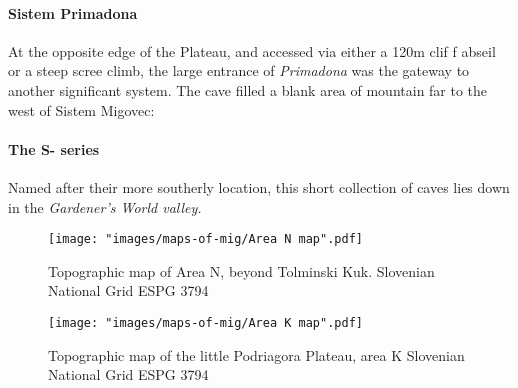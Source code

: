 \paragraph{Sistem Primadona} At the opposite edge of the Plateau, and accessed via either a 120m clif f abseil or a steep scree climb, the large entrance of \emph{Primadona} was the gateway to another significant system. The cave filled a blank area of mountain far to the west of Sistem Migovec: 

\paragraph{The S- series} Named after their more southerly location, this short collection of caves lies down in   the \emph{Gardener's World valley.}

 
 \begin{figure*}[t!]
 \checkoddpage \ifoddpage \forcerectofloat \else \forceversofloat \fi
\centering
  \texttt{[image: "images/maps-of-mig/Area N map".pdf]}
  \label{map m}
  \caption{Topographic map of Area N, beyond Tolminski Kuk. Slovenian National Grid ESPG 3794}
 \end{figure*}
 
 \begin{figure*}[t!]
 \checkoddpage \ifoddpage \forcerectofloat \else \forceversofloat \fi
\centering
  \texttt{[image: "images/maps-of-mig/Area K map".pdf]}
  \label{map m}
  \caption{Topographic map of the little Podriagora Plateau, area K Slovenian National Grid ESPG 3794}
 \end{figure*}
 
 